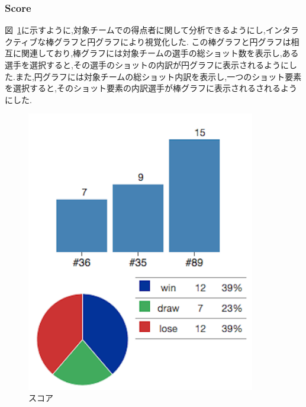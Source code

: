 \documentclass[sotsuron]{kuee}
\begin{document}
			\subsubsection{Score}
				図~\ref{fig:score}に示すように,対象チームでの得点者に関して分析できるようにし,インタラクティブな棒グラフと円グラフにより視覚化した.
				この棒グラフと円グラフは相互に関連しており,棒グラフには対象チームの選手の総ショット数を表示し,ある選手を選択すると,その選手のショットの内訳が円グラフに表示されるようにした.また,円グラフには対象チームの総ショット内訳を表示し,一つのショット要素を選択すると,そのショット要素の内訳選手が棒グラフに表示されるされるようにした.
					\begin{figure}
						\begin{center}
							\includegraphics[width=10cm]{./png/score.png}
						\end{center}
						\caption{スコア}
				  		\label{fig:score}
					\end{figure}
\end{document}
